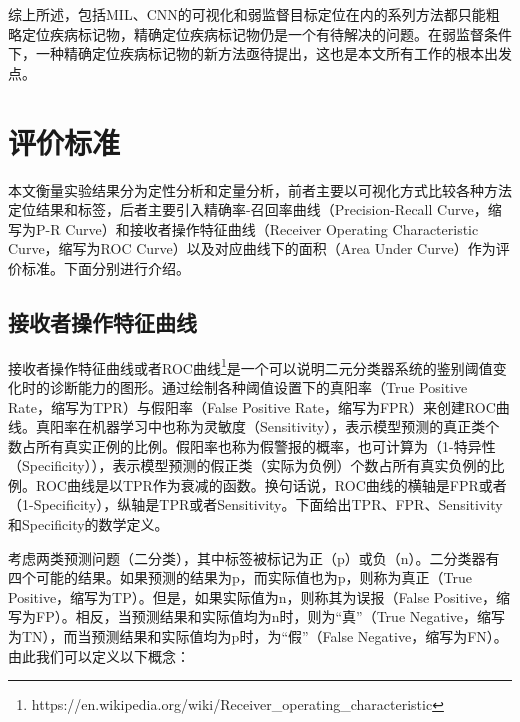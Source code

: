 综上所述，包括MIL、CNN的可视化和弱监督目标定位在内的系列方法都只能粗略定位疾病标记物，精确定位疾病标记物仍是一个有待解决的问题。在弱监督条件下，一种精确定位疾病标记物的新方法亟待提出，这也是本文所有工作的根本出发点。

\section{评价标准}\label{sec:evaluation_metrics}
本文衡量实验结果分为定性分析和定量分析，前者主要以可视化方式比较各种方法定位结果和标签，后者主要引入精确率-召回率曲线（Precision-Recall Curve，缩写为P-R Curve）和接收者操作特征曲线（Receiver Operating Characteristic Curve，缩写为ROC Curve）以及对应曲线下的面积（Area Under Curve）作为评价标准。下面分别进行介绍。
\subsection{接收者操作特征曲线}\label{subsec:roc_curve}
接收者操作特征曲线或者ROC曲线\footnote{https://en.wikipedia.org/wiki/Receiver\_operating\_characteristic}是一个可以说明二元分类器系统的鉴别阈值变化时的诊断能力的图形。通过绘制各种阈值设置下的真阳率（True Positive Rate，缩写为TPR）与假阳率（False Positive Rate，缩写为FPR）来创建ROC曲线。真阳率在机器学习中也称为灵敏度（Sensitivity），表示模型预测的真正类个数占所有真实正例的比例。假阳率也称为假警报的概率，也可计算为（1-特异性（Specificity）），表示模型预测的假正类（实际为负例）个数占所有真实负例的比例。ROC曲线是以TPR作为衰减的函数。换句话说，ROC曲线的横轴是FPR或者（1-Specificity），纵轴是TPR或者Sensitivity。下面给出TPR、FPR、Sensitivity和Specificity的数学定义。

考虑两类预测问题（二分类），其中标签被标记为正（p）或负（n）。二分类器有四个可能的结果。如果预测的结果为p，而实际值也为p，则称为真正（True Positive，缩写为TP）。但是，如果实际值为n，则称其为误报（False Positive，缩写为FP）。相反，当预测结果和实际值均为n时，则为“真”（True Negative，缩写为TN），而当预测结果和实际值均为p时，为“假”（False Negative，缩写为FN）。由此我们可以定义以下概念：



